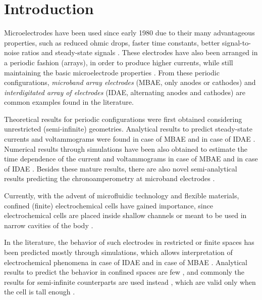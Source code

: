 

\section{Introduction}

Microelectrodes have been used since early 1980 \cite{Dayton:1980:}
due to their many advantageous properties, such as reduced ohmic drops,
faster time constants, better signal-to-noise ratios
and steady-state signals \cite{Forster:2007:,Szunerits:2007:}.
These electrodes have also been arranged in a periodic fashion (arrays),
in order to produce higher currents, while still maintaining
the basic microelectrode properties \cite{Szunerits:2007:}.
From these periodic configurations, \emph{microband array electrodes} (MBAE, only anodes or cathodes)
and \emph{interdigitated array of electrodes} (IDAE, alternating anodes and cathodes)
are common examples found in the literature.

Theoretical results for periodic configurations were first obtained
considering unrestricted (semi-infinite) geometries.
Analytical results to predict steady-state currents and voltammograms were found
in case of MBAE \cite{Morf:1996:sep,Morf:2006:may} and
in case of IDAE \cite{Aoki:1988:dec,Aoki:1990:apr,Morf:2006:may}.
Numerical results through simulations have been also obtained
to estimate the time dependence of the current and voltammograms
in case of MBAE \cite{Bard:1986:sep,Streeter:2007:aug,Pebay:2013:dec} and
in case of IDAE \cite{Aoki:1989:jul,Jin:1996:aug:b,Yang:2007:oct}.
Besides these mature results, there are also novel semi-analytical results
predicting the chronoamperometry at microband electrodes \cite{Bieniasz:2015:oct}.

Currently, with the advent of microfluidic technology and flexible materials,
confined (finite) electrochemical cells have gained importance,
since electrochemical cells are placed inside shallow channels \cite{Han:2014:}
or meant to be used in narrow cavities of the body \cite{Kanno:2014:}.

In the literature, the behavior of such electrodes
in restricted or finite spaces has been predicted mostly through simulations,
which allows interpretation of electrochemical phenomena
in case of IDAE \cite{Strutwolf:2005:feb,Goluch:2009:may,Han:2014:,Kanno:2014:}
and in case of MBAE \cite{Bellagha-Chenchah:2016:jun}.
Analytical results to predict the behavior in confined spaces are few
\cite{GuajardoYevenes:2013:sep},
and commonly the results for semi-infinite counterparts are used instead \cite{Shim:2013:},
which are valid only when the cell is tall enough \cite{GuajardoYevenes:2013:sep}.

